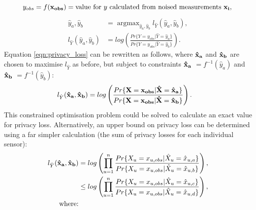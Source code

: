 \documentclass[12pt]{article}
\DeclareMathOperator*{\argmax}{argmax}
\begin{document}
\begin{appendix}
    \begin{equation}
      y_{obs} = f(\bf{x}_{obs}) = \text{value for $y$ calculated from noised measurements $\bf{x}_i$}, \nonumber\\
    \end{equation}
    \begin{align}
      \hat{y}_a, \hat{y}_b & = \argmax_{\hat{y}_a, \hat{y}_b} l_{\hat{Y}}(\hat{y}_a, \hat{y}_b), \label{eqn:argmax}\\
      l_{\hat{Y}}(\hat{y}_a, \hat{y}_b) & = log \left( \frac{Pr\{ Y = y_{obs} | \hat{Y} = \hat{y}_a \}}{Pr\{ Y = y_{obs} | \hat{Y} = \hat{y}_b \}} \right). \label{eqn:privacy_loss}
    \end{align}
    Equation \ref{eqn:privacy_loss} can be rewritten as follows, where $\bf{\hat{x}_a}$ and $\bf{\hat{x}_b}$ are chosen to maximise $l_{\hat{Y}}$ as before, but subject to constraints $\bf{\hat{x}_a}$ $ = f^{-1}(\hat{y}_a)$ and $\bf{\hat{x}_b}$ $ = f^{-1}(\hat{y}_b)$:
    \begin{align}
      l_{\hat{Y}}(\bf{\hat{x}_a}, \bf{\hat{x}_b}) & = log \left( \frac{Pr\{ \bf{X} = \bf{x}_{obs} | \bf{\hat{X}} = \bf{\hat{x}_a} \}}{Pr\{ \bf{X} = \bf{x}_{obs} | \bf{\hat{X}} = \bf{\hat{x}_b} \}} \right). \label{eqn:exact_indirect_priv_loss}
    \end{align}
    This constrained optimisation problem could be solved to calculate an exact value for privacy loss. Alternatively, an upper bound on privacy loss can be determined using a far simpler calculation (the sum of privacy losses for each individual sensor):
    \begin{align}
      l_{\hat{Y}}(\bf{\hat{x}_a}, \bf{\hat{x}_b}) & = log \left( \prod_{u=1}^n \frac{Pr\{ X_u = x_{u,obs} | \hat{X}_u = \hat{x}_{u,a} \}} {Pr\{ X_u = x_{u,obs} | \hat{X}_u = \hat{x}_{u,b} \}} \right), \nonumber \\
      & \leq log \left( \prod_{u=1}^n \frac{Pr\{ X_u = x_{u,obs} | \hat{X}_u = \hat{x}_{u,c} \}}{Pr\{ X_u = x_{u,obs} | \hat{X}_u = \hat{x}_{u,d} \}} \right), \label{eqn:upper_bound} \\
      \text{where:} & \nonumber \\

\end{align}
\end{appendix}
\end{document}
